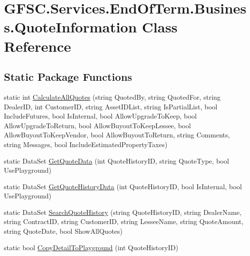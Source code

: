 \hypertarget{class_g_f_s_c_1_1_services_1_1_end_of_term_1_1_business_1_1_quote_information}{}\section{G\+F\+S\+C.\+Services.\+End\+Of\+Term.\+Business.\+Quote\+Information Class Reference}
\label{class_g_f_s_c_1_1_services_1_1_end_of_term_1_1_business_1_1_quote_information}
\subsection*{Static Package Functions}
\begin{DoxyCompactItemize}
\item 
static int \mbox{\hyperlink{class_g_f_s_c_1_1_services_1_1_end_of_term_1_1_business_1_1_quote_information_a1ed86097ab0677ef0fbb381a444ee2d6}{Calculate\+All\+Quotes}} (string Quoted\+By, string Quoted\+For, string Dealer\+ID, int Customer\+ID, string Asset\+I\+D\+List, string Is\+Partial\+List, bool Include\+Futures, bool Is\+Internal, bool Allow\+Upgrade\+To\+Keep, bool Allow\+Upgrade\+To\+Return, bool Allow\+Buyout\+To\+Keep\+Lessee, bool Allow\+Buyout\+To\+Keep\+Vendor, bool Allow\+Buyout\+To\+Return, string Comments, string Messages, bool Include\+Estimated\+Property\+Taxes)
\item 
static Data\+Set \mbox{\hyperlink{class_g_f_s_c_1_1_services_1_1_end_of_term_1_1_business_1_1_quote_information_a72d3ea2defba70b6b3b853ddbc988aea}{Get\+Quote\+Data}} (int Quote\+History\+ID, string Quote\+Type, bool Use\+Playground)
\item 
static Data\+Set \mbox{\hyperlink{class_g_f_s_c_1_1_services_1_1_end_of_term_1_1_business_1_1_quote_information_a71befa60389b0814575b33e584bc358d}{Get\+Quote\+History\+Data}} (int Quote\+History\+ID, bool Is\+Internal, bool Use\+Playground)
\item 
static Data\+Set \mbox{\hyperlink{class_g_f_s_c_1_1_services_1_1_end_of_term_1_1_business_1_1_quote_information_ab289a41ea16998c0a5ffa196b8eb9f64}{Search\+Quote\+History}} (string Quote\+History\+ID, string Dealer\+Name, string Contract\+ID, string Customer\+ID, string Lessee\+Name, string Quote\+Amount, string Quote\+Date, bool Show\+All\+Quotes)
\item 
static bool \mbox{\hyperlink{class_g_f_s_c_1_1_services_1_1_end_of_term_1_1_business_1_1_quote_information_ac658760f200d299fbe635e9833522c76}{Copy\+Detail\+To\+Playground}} (int Quote\+History\+ID)

\end{DoxyCompactItemize}
